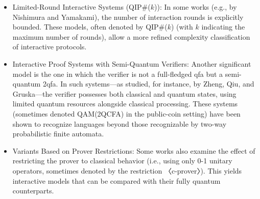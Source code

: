 \begin{itemize}
  \item Limited-Round Interactive Systems (QIP\#($k$)): In some works (e.g., by Nishimura and Yamakami), the number of interaction rounds is explicitly bounded. These models, often denoted by QIP\#($k$) (with $k$ indicating the maximum number of rounds), allow a more refined complexity classification of interactive protocols.
  
  \item Interactive Proof Systems with Semi-Quantum Verifiers: Another significant model is the one in which the verifier is not a full-fledged \gls{qfa} but a semi-quantum \gls{2qfa}. In such systems—as studied, for instance, by Zheng, Qiu, and Gruska—the verifier possesses both classical and quantum states, using limited quantum resources alongside classical processing. These systems (sometimes denoted QAM(2QCFA) in the public-coin setting) have been shown to recognize languages beyond those recognizable by two-way probabilistic finite automata.
  
  \item Variants Based on Prover Restrictions: Some works also examine the effect of restricting the prover to classical behavior (i.e., using only 0-1 unitary operators, sometimes denoted by the restriction 〈c-prover〉). This yields interactive models that can be compared with their fully quantum counterparts.
\end{itemize}